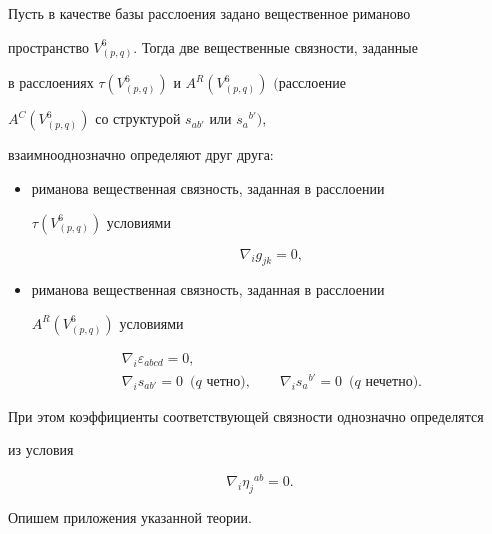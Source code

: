 \begin{thm}


Пусть в качестве базы расслоения задано вещественное риманово


пространство $V^6_{(p,q)}$. Тогда две вещественные связности, заданные


в расслоениях $\tau(V^6_{(p,q)})$ и $A^R(V^6_{(p,q)})$ $($расслоение


$A^C(V^6_{(p,q)})$ со структурой $s_{ab'}$ или $s_a{}^{b'})$,


взаимнооднозначно определяют друг друга$:$


\begin{itemize}


\item[1.] риманова вещественная связность, заданная в расслоении


$\tau(V^6_{(p,q)})$ условиями


$$




\nabla_i g_{jk}=0,


$$


\item[2.] риманова вещественная связность, заданная в расслоении


$A^R(V^6_{(p,q)})$ условиями


\begin{gather*}




\nabla_i\varepsilon_{abcd}=0,\\


\nabla_is_{ab'}=0\ \; \text{$(q$ четно$)$},\qquad


\nabla_is_a{}^{b'}=0\ \; \text{$(q$ нечетно$)$}.


\end{gather*}


\end{itemize}


При этом коэффициенты соответствующей связности однозначно определятся


из условия


$$


\nabla_i \eta_j{}^{ab}=0.


$$




\end{thm}





Опишем приложения указанной теории.





